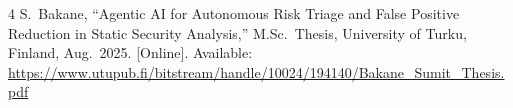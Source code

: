 \documentclass[conference]{IEEEtran}
\begin{document}
\begin{enumerate}[leftmargin=*, label=\arabic*.]
\begin{thebibliography}{4}
S.~Bakane,
``Agentic AI for Autonomous Risk Triage and False Positive Reduction in
  Static Security Analysis,''
M.Sc.\ Thesis, University of Turku, Finland, Aug.\ 2025.
[Online]. Available:
\url{https://www.utupub.fi/bitstream/handle/10024/194140/Bakane_Sumit_Thesis.pdf}

\end{thebibliography}






\end{enumerate}
\end{document}
